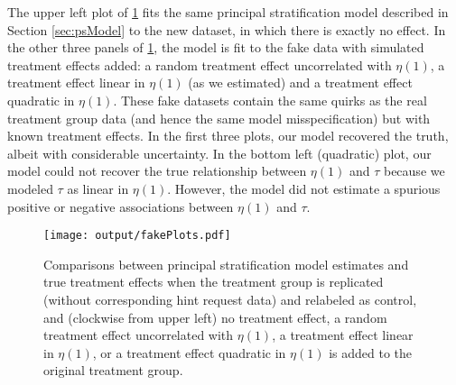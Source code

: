 \documentclass{article}\usepackage[]{graphicx}\usepackage[]{color}
\begin{document}
The upper left plot of \ref{fig:fakeSim} fits the same principal
stratification model described in Section \ref{sec:psModel} to the new
dataset, in which there is exactly no effect.
In the other three panels of \ref{fig:fakeSim}, the model is fit to
the fake data with simulated treatment effects added: a random
treatment effect uncorrelated with $\eta(1)$, a treatment effect
linear in $\eta(1)$ (as we estimated) and a treatment effect quadratic
in $\eta(1)$.
These fake datasets contain the same quirks as the real treatment
group data (and hence the same model misspecification) but with known
treatment effects.
In the first three plots, our model recovered the truth, albeit with
considerable uncertainty.
In the bottom left (quadratic) plot, our model could not recover the
true relationship between $\eta(1)$ and $\tau$ because we modeled
$\tau$ as linear in $\eta(1)$. However, the model did not estimate
a spurious positive or negative associations between $\eta(1)$ and $\tau$.


\begin{figure}[!h]
\centering
\texttt{[image: output/fakePlots.pdf]}
\caption{Comparisons between principal stratification model estimates
  and true treatment effects when the treatment group is replicated
  (without corresponding hint request data) and relabeled as control,
  and (clockwise from upper left) no treatment effect, a
  random treatment effect uncorrelated with $\eta(1)$, a treatment
  effect linear in $\eta(1)$, or a treatment effect quadratic in
  $\eta(1)$ is added to the original treatment group.}
\label{fig:fakeSim}
\end{figure}
\end{document}
